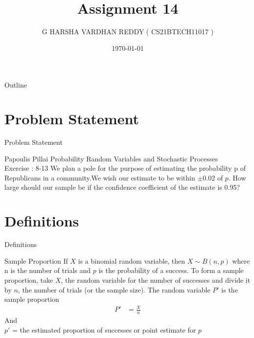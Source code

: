 \documentclass{beamer}
\title{Assignment 14}
\author[CS21BTECH11017]{G HARSHA VARDHAN REDDY ( CS21BTECH11017 )}
\date{\today}
\begin{document}
\begin{frame}
    \titlepage 
\end{frame}

\logo{}


\begin{frame}{Outline}
    \tableofcontents
\end{frame}

\section{Problem Statement}
\begin{frame}{Problem Statement}
    \begin{block} {Papoulis Pillai Probability Random Variables and Stochastic Processes\\ 
    Exercise : 8-13}
    We plan a pole for the purpose of estimating the probability p of Republicans in a community.We wish our estimate to be within $\pm 0.02$ of  $p$. How large should our sample be if the confidence coefficient of the estimate is 0.95?
    \end{block}
\end{frame}
\section{Definitions}
\begin{frame}{Definitions}
    \begin{block}{Sample Proportion}
     If $X$ is a binomial random variable, then $X \sim B(n, p)$ where n is the number of trials and $p$ is the probability of a success. To form a sample proportion, take $X$, the random variable for the number of successes and divide it by $n$, the number of trials (or the sample size). The random variable $P'$ is the sample proportion
     \begin{align}
         P' &= \frac{X}{n} 
     \end{align}
And \\
    $p'$ =  the estimated proportion of successes or point estimate for $p$
    \end{block}
\end{frame}
\end{document}
